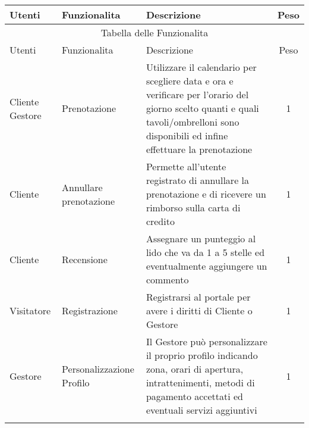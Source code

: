 
\makegapedcells\keepXColumns

\begin{tabularx}{\textwidth}{|X|X|X|c|}
  \hline
   Utenti & Funzionalita & Descrizione & Peso\\
  \hline
\endhead
  \multicolumn{4}{c}{Tabella delle Funzionalita}\\
  \hline
  Utenti & Funzionalita & Descrizione & Peso\\
  \hline
  Cliente \newline Gestore & Prenotazione & Utilizzare il calendario per scegliere data e ora e verificare per l’orario del giorno scelto quanti e quali tavoli/ombrelloni
  sono disponibili ed infine effettuare la prenotazione & 1\\
  \hline
  Cliente & Annullare prenotazione & Permette all'utente registrato di annullare la prenotazione e di     ricevere un rimborso sulla carta di credito & 1\\
  \hline
  Cliente & Recensione & Assegnare un punteggio al lido che va da 1 a 5 stelle ed eventualmente aggiungere un commento & 1\\
  \hline
Visitatore & Registrazione & Registrarsi al portale per avere i diritti di Cliente o Gestore & 1\\
\hline
Gestore & Personalizzazione Profilo & Il Gestore può personalizzare il proprio profilo indicando zona, orari di apertura, intrattenimenti, metodi di pagamento accettati ed eventuali servizi aggiuntivi & 1\\
\hline

\endfirsthead
\endfoot
\endlastfoot




\end{tabularx}
